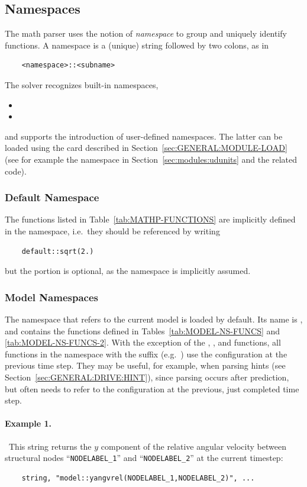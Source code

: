 \subsection{Namespaces}
\label{sec:GENERAL:NAMESPACE}
The math parser uses the notion of \emph{namespace} to group and uniquely identify functions.
A namespace is a (unique) string followed by two colons, as in
\begin{verbatim}
    <namespace>::<subname>
\end{verbatim}
The solver recognizes built-in namespaces,
\begin{itemize}
	\item {}
	\item {}
\end{itemize}
and supports the introduction of user-defined namespaces.
The latter can be loaded using the  card described
in Section~\ref{sec:GENERAL:MODULE-LOAD}
(see for example the  namespace in Section~\ref{sec:modules:udunits} and the related code).

\subsubsection{Default Namespace}
The functions listed in Table~\ref{tab:MATHP-FUNCTIONS}
are implicitly defined in the  namespace, 
i.e.\ they should be referenced by writing
\begin{verbatim}
    default::sqrt(2.)
\end{verbatim}
but the  portion is optional, as the  namespace is implicitly assumed.

\subsubsection{Model Namespaces}
The namespace that refers to the current model is loaded by default.
Its name is , and contains the functions 
defined in Tables~\ref{tab:MODEL-NS-FUNCS} and \ref{tab:MODEL-NS-FUNCS-2}.
With the exception of the , , and  functions,
all functions in the  namespace
with the suffix  (e.g.\ )
use the configuration at the previous time step.
They may be useful, for example, when parsing hints
(see Section~\ref{sec:GENERAL:DRIVE:HINT}),
since  parsing occurs after prediction,
but often needs to refer to the configuration
at the previous, just completed time step.

\paragraph{Example 1.} \
This string returns the $y$ component of the relative angular velocity between structural nodes ``\verb;NODELABEL_1;'' and ``\verb;NODELABEL_2;'' at the current timestep:
\begin{verbatim}
    string, "model::yangvrel(NODELABEL_1,NODELABEL_2)", ...
\end{verbatim}


